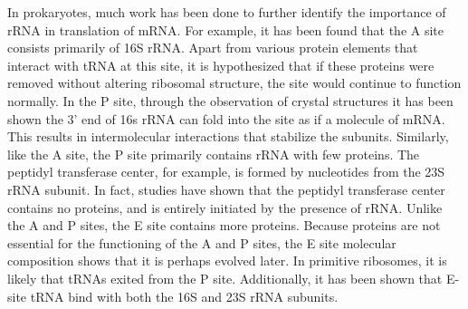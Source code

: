 In prokaryotes, much work has been done to further identify the importance of rRNA in translation of mRNA. For example, it has been found that the A site consists primarily of 16S rRNA. Apart from various protein elements that interact with tRNA at this site, it is hypothesized that if these proteins were removed without altering ribosomal structure, the site would continue to function normally. In the P site, through the observation of crystal structures it has been shown the 3' end of 16s rRNA can fold into the site as if a molecule of mRNA. This results in intermolecular interactions that stabilize the subunits. Similarly, like the A site, the P site primarily contains rRNA with few proteins. The peptidyl transferase center, for example, is formed by nucleotides from the 23S rRNA subunit. In fact, studies have shown that the peptidyl transferase center contains no proteins, and is entirely initiated by the presence of rRNA. Unlike the A and P sites, the E site contains more proteins. Because proteins are not essential for the functioning of the A and P sites, the E site molecular composition shows that it is perhaps evolved later. In primitive ribosomes, it is likely that tRNAs exited from the P site. Additionally, it has been shown that E-site tRNA bind with both the 16S and 23S rRNA subunits.